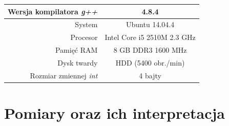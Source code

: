 \documentclass[11pt,a4paper]{article}
\begin{document}
\begin{center}
	\begin{tabular}{| r | c |}
	\hline
	Wersja kompilatora \textit{g++} & 4.8.4 \\ \hline
	System & Ubuntu 14.04.4 \\ \hline
	Procesor	 & Intel Core i5 2510M 2.3 GHz \\ \hline
	Pamięć RAM & 8 GB DDR3 1600 MHz \\ \hline
	Dysk twardy & HDD (5400 obr./min) \\ \hline
	Rozmiar zmiennej \textit{int} & 4 bajty \\ \hline
	\end{tabular}
\end{center}
\newpage
\section{Pomiary oraz ich interpretacja}
\end{document}
